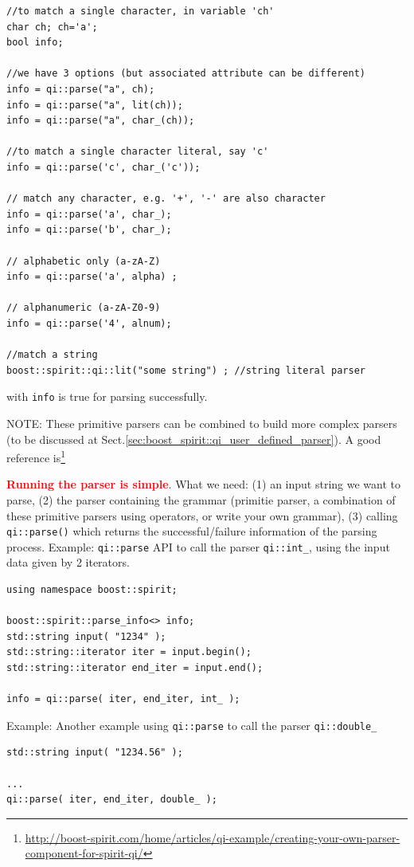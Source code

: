 \begin{verbatim}
//to match a single character, in variable 'ch'
char ch; ch='a';
bool info;

//we have 3 options (but associated attribute can be different)
info = qi::parse("a", ch);
info = qi::parse("a", lit(ch));
info = qi::parse("a", char_(ch));

//to match a single character literal, say 'c'
info = qi::parse('c', char_('c'));

// match any character, e.g. '+', '-' are also character
info = qi::parse('a', char_);
info = qi::parse('b', char_);

// alphabetic only (a-zA-Z)
info = qi::parse('a', alpha) ;

// alphanumeric (a-zA-Z0-9)
info = qi::parse('4', alnum);

//match a string
boost::spirit::qi::lit("some string") ; //string literal parser
\end{verbatim}
with \verb!info! is true for parsing successfully.


NOTE: These primitive parsers can be combined to build more complex parsers
(to be discussed at Sect.\ref{sec:boost_spirit::qi_user_defined_parser}). A good reference
is\footnote{\url{http://boost-spirit.com/home/articles/qi-example/creating-your-own-parser-component-for-spirit-qi/}}

\textcolor{red}{\bf Running the parser is simple}. What we need: (1) an input
string we want to parse, (2) the parser containing the grammar (primitie
parser, a combination of these primitive parsers using operators, or write your
own grammar), (3) calling \verb!qi::parse()! which returns the
successful/failure information of the parsing process. Example: \verb!qi::parse!
API to call the parser \verb!qi::int_!, using the input data given by 2
iterators.

\begin{verbatim}
using namespace boost::spirit;

boost::spirit::parse_info<> info;
std::string input( "1234" );
std::string::iterator iter = input.begin();
std::string::iterator end_iter = input.end();

info = qi::parse( iter, end_iter, int_ );
\end{verbatim}

Example: Another example using \verb!qi::parse! to call the parser
\verb!qi::double_!
\begin{verbatim}
std::string input( "1234.56" );

...
qi::parse( iter, end_iter, double_ );
\end{verbatim}

